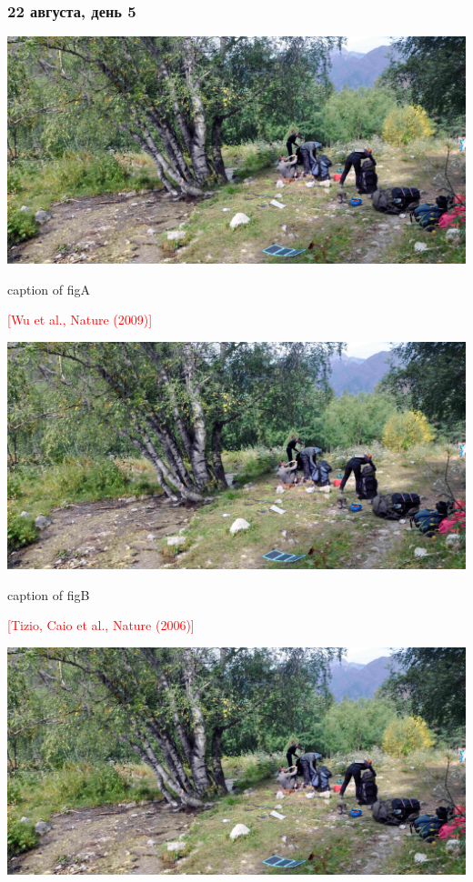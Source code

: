 \documentclass[
11pt, %
]{beamer}
\begin{document}
	\begin{frame}
		\frametitle{22 августа, день 5}
		\begin{minipage}{.5\textwidth}
			\centering
			\includegraphics[height=0.55\textheight]{../pics/DSC_1181}
			
			caption of figA
			
			\scriptsize\textcolor{red}{[Wu et al., Nature (2009)]}
		\end{minipage}%
		\begin{minipage}{.5\textwidth}
			\centering
			\includegraphics[height=0.55\textheight]{../pics/DSC_1181}
			
			caption of figB
			
			\scriptsize\textcolor{red}{[Tizio, Caio et al., Nature (2006)]}
		\end{minipage}
				\begin{minipage}{.5\textwidth}
			\centering
			\includegraphics[height=0.55\textheight]{../pics/DSC_1181}
			

\end{minipage}
\end{frame}
\end{document}
